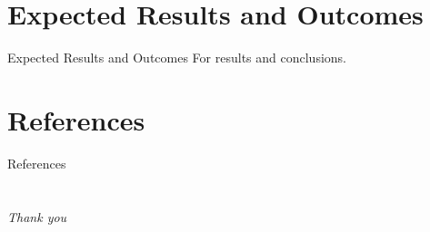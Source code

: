 \documentclass[xcolor=dvipsnames, compress]{beamer}
\begin{document}
\section{Expected Results and Outcomes}
\begin{frame}{Expected Results and Outcomes}
For results and conclusions.
\end{frame}


\section*{References}
\begin{frame}[allowframebreaks]{References}

\printbibliography[heading=none]

\end{frame}


\section{}
\begin{frame}[c]
\begin{center}

\textcolor{blue!70}{\textrm{\Huge\textit{Thank you}}}
\end{center}
\end{frame}
\end{document}
